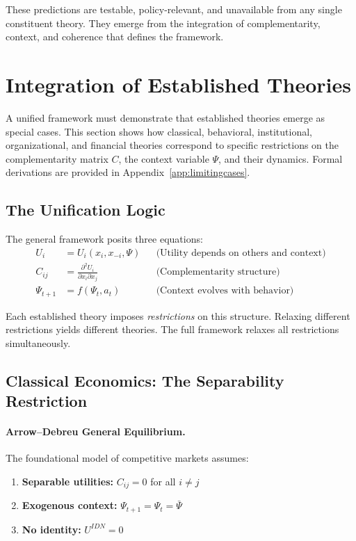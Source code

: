 \documentclass[12pt,a4paper]{article}
\begin{document}
These predictions are testable, policy-relevant, and unavailable from
any single constituent theory. They emerge from the integration of
complementarity, context, and coherence that defines the framework.

\section{Integration of Established Theories}
\label{sec:integration}

A unified framework must demonstrate that established theories emerge as special cases.
This section shows how classical, behavioral, institutional, organizational, and financial 
theories correspond to specific restrictions on the complementarity matrix $C$, 
the context variable $\Psi$, and their dynamics.
Formal derivations are provided in Appendix~\ref{app:limitingcases}.

\subsection{The Unification Logic}

The general framework posits three equations:
\begin{align}
  U_i &= U_i(x_i, x_{-i}, \Psi) && \text{(Utility depends on others and context)} \\
  C_{ij} &= \frac{\partial^2 U_i}{\partial x_i \partial x_j} && \text{(Complementarity structure)} \\
  \Psi_{t+1} &= f(\Psi_t, a_t) && \text{(Context evolves with behavior)}
\end{align}

Each established theory imposes \emph{restrictions} on this structure.
Relaxing different restrictions yields different theories.
The full framework relaxes all restrictions simultaneously.

\subsection{Classical Economics: The Separability Restriction}

\paragraph{Arrow--Debreu General Equilibrium.}
The foundational model of competitive markets \citep{arrowdeb} assumes:
\begin{enumerate}
  \item \textbf{Separable utilities:} $C_{ij} = 0$ for all $i \neq j$
  \item \textbf{Exogenous context:} $\Psi_{t+1} = \Psi_t = \bar{\Psi}$
  \item \textbf{No identity:} $U^{IDN} = 0$
\end{enumerate}
\end{document}
